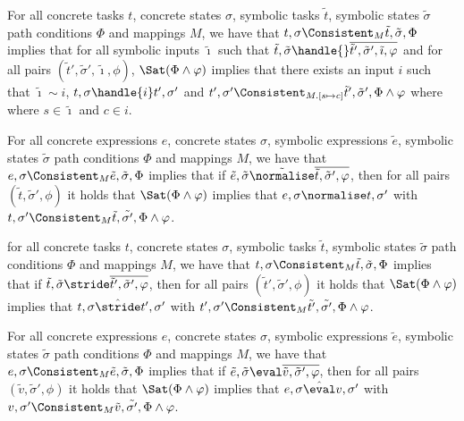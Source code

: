 \begin{lemma}
  \label{lem:soundhandle}

  For all concrete tasks $t$, concrete states $\sigma$, symbolic tasks $\tilde{t}$, symbolic states $\tilde{\sigma}$ path conditions $\Phi$ and mappings $M$,
  we have that $t,\sigma\Consistent_{M}\tilde{t},\tilde{\sigma},\Phi$ implies
  that for all symbolic inputs $\tilde{\imath}$ such that $\tilde{t},\tilde{\sigma}\handle{}\overline{\tilde{t}',\tilde{\sigma}',\tilde{\imath},\phi}$ and
  for all pairs $(\tilde{t}',\tilde{\sigma}',\tilde{\imath},\phi)$,
  $\Sat(\Phi\land\phi)$ implies that there exists an input $i$ such that $\tilde{\imath}\sim i$,  $t,\sigma\handle{i}t',\sigma'$ and $t',\sigma'\Consistent_{M.[s\mapsto c]}\tilde{t}',\tilde{\sigma}',\Phi\land\phi$ where where $s\in\tilde{\imath}$ and $c\in i$.

\end{lemma}



\begin{lemma}
  \label{lem:soundnorm}
  For all concrete expressions $e$, concrete states $\sigma$, symbolic expressions $\tilde{e}$, symbolic states $\tilde{\sigma}$ path conditions $\Phi$ and mappings $M$,
  we have that $e,\sigma\Consistent_{M}\tilde{e},\tilde{\sigma},\Phi$ implies
  that if $\tilde{e},\tilde{\sigma}\tilde{\normalise}\overline{\tilde{t},\tilde{\sigma}',\phi}$,
  then for all pairs $(\tilde{t},\tilde{\sigma}',\phi)$ it holds that $\Sat(\Phi\land\phi)$ implies
  that $e,\sigma\normalise t,\sigma'$ with $t,\sigma'\Consistent_{M}\tilde{t},\tilde{\sigma'},\Phi\land\phi$.
\end{lemma}

\begin{lemma}
  \label{lem:soundstride}
  for all concrete tasks $t$, concrete states $\sigma$, symbolic tasks $\tilde{t}$, symbolic states $\tilde{\sigma}$ path conditions $\Phi$ and mappings $M$,
  we have that $t,\sigma\Consistent_{M}\tilde{t},\tilde{\sigma},\Phi$ implies
  that if $\tilde{t},\tilde{\sigma}\stride\overline{\tilde{t}',\tilde{\sigma}',\phi}$,
  then for all pairs $(\tilde{t}',\tilde{\sigma}',\phi)$ it holds that $\Sat(\Phi\land\phi)$ implies
  that $t,\sigma\hat{\stride}t',\sigma'$ with $t',\sigma'\Consistent_{M}\tilde{t'},\tilde{\sigma'},\Phi\land\phi$.
\end{lemma}

\begin{lemma}
  \label{lem:soundeval}
  For all concrete expressions $e$, concrete states $\sigma$, symbolic expressions $\tilde{e}$, symbolic states $\tilde{\sigma}$ path conditions $\Phi$ and mappings $M$,
  we have that $e,\sigma\Consistent_{M}\tilde{e},\tilde{\sigma},\Phi$ implies
  that if $\tilde{e},\tilde{\sigma}\eval\overline{\tilde{v},\tilde{\sigma}',\phi}$,
  then for all pairs $(\tilde{v},\tilde{\sigma}',\phi)$ it holds that $\Sat(\Phi\land\phi)$ implies
  that $e,\sigma\hat{\eval}v,\sigma'$ with $v,\sigma'\Consistent_{M}\tilde{v},\tilde{\sigma'},\Phi\land\phi$.
\end{lemma}




